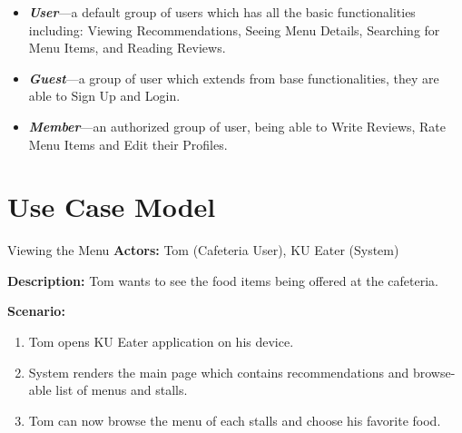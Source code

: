 \begin{itemize}
    \item \textbf{\textit{User}}---a default group of users which has all the basic functionalities including: Viewing Recommendations, Seeing Menu Details,
    Searching for Menu Items, and Reading Reviews.
    \item \textbf{\textit{Guest}}---a group of user which extends from base functionalities, they are able to Sign Up and Login.
    \item \textbf{\textit{Member}}---an authorized group of user, being able to Write Reviews, Rate Menu Items and Edit their Profiles.
\end{itemize}

\section{Use Case Model}
\label{section:use-case-model}


\begin{usecase}{Viewing the Menu}
    \textbf{Actors:} Tom (Cafeteria User), KU Eater (System)
    
    \textbf{Description:} Tom wants to see the food items being offered at the cafeteria.

    \textbf{Scenario:}

    \begin{enumerate}[leftmargin=80pt]
        \item Tom opens KU Eater application on his device.
        \item System renders the main page which contains recommendations and browse-able list of menus and stalls.
        \item Tom can now browse the menu of each stalls and choose his favorite food.
    \end{enumerate}
\end{usecase}

